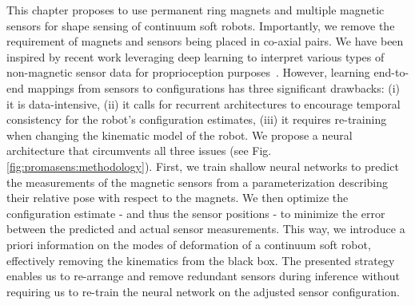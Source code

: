 This chapter proposes to use permanent ring magnets and multiple magnetic sensors for shape sensing of continuum soft robots. Importantly, we remove the requirement of magnets and sensors being placed in co-axial pairs.
%
We have been inspired by recent work leveraging deep learning to interpret various types of non-magnetic sensor data for proprioception purposes~\citep{truby2020distributed, ding2021predictive, soter2018bodily, thuruthel2019soft}.
%
However, learning end-to-end mappings from sensors to configurations has three significant drawbacks: (i) it is data-intensive, (ii) it calls for recurrent architectures to encourage temporal consistency for the robot's configuration estimates, (iii) it requires re-training when changing the kinematic model of the robot. We propose a neural architecture that circumvents all three issues (see Fig. \ref{fig:promasens:methodology}).
First, we train shallow neural networks to predict the measurements of the magnetic sensors from a parameterization describing their relative pose with respect to the magnets. We then optimize the configuration estimate - and thus the sensor positions - to minimize the error between the predicted and actual sensor measurements. 
This way, we introduce a priori information on the modes of deformation of a continuum soft robot, effectively removing the kinematics from the black box. 
The presented strategy enables us to re-arrange and remove redundant sensors during inference without requiring us to re-train the neural network on the adjusted sensor configuration.

